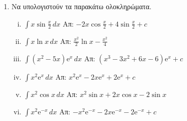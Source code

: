\documentclass[a4paper,table]{report}
\begin{document}
\begin{center}
\minibox{\large\bfseries \textcolor{Col1}{Ολοκλήρωμα}}
\end{center}

\vspace{\baselineskip}

\begin{enumerate}
  \item Να υπολογιστούν τα παρακάτω ολοκληρώματα.
    \begin{enumerate}[i)]
      \item $ \int x \sin{\frac{x}{2}} \,{dx} $ 
        \hfill Απ: $ -2x \cos{\frac{x}{2}} + 4 \sin{\frac{x}{2}} +c $
      \item $ \int x \ln{x} \,{dx} $ 
        \hfill Απ: $ \frac{x^{2}}{2} \ln{x} - \frac{x^{2}}{4} $ 
      \item $ \int (x^{2}-5x) \mathrm{e}^{x} \,{dx} $ 
        \hfill Απ: $ (x^{3}-3x^{2}+6x-6) \mathrm{e}^{x} + c  $  
      \item $ \int x^{2} \mathrm{e}^{x} \,{dx} $ 
        \hfill Απ: $ x^{2} \mathrm{e}^{x} -2 x \mathrm{e}^{x} + 2 \mathrm{e}^{x} + c $
      \item $ \int x^{2} \cos{x} \,{dx} $ 
        \hfill Απ: $ x^{2} \sin{x} + 2 x \cos{x} - 2 \sin{x} $ 
      \item $ \int x^{2} \mathrm{e}^{-x} \,{dx} $
        \hfill Απ: $ -x^{2} \mathrm{e}^{-x} -2 x \mathrm{e}^{-x}-2 \mathrm{e}^{-x}+c$ 
    \end{enumerate}
\end{enumerate}
\end{document}
